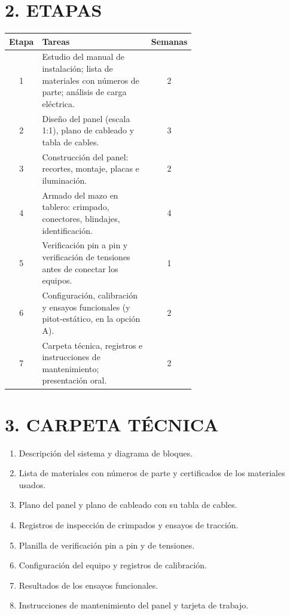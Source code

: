 \section*{2. ETAPAS}
\begin{center}
\small
\begin{tabular}{|c|p{0.62\linewidth}|c|}
\hline
\textbf{Etapa} & \textbf{Tareas} & \textbf{Semanas} \\ \hline
1 & Estudio del manual de instalación; lista de materiales con números de parte; análisis de
carga eléctrica. & 2 \\ \hline
2 & Diseño del panel (escala 1:1), plano de cableado y tabla de cables. & 3 \\ \hline
3 & Construcción del panel: recortes, montaje, placas e iluminación. & 2 \\ \hline
4 & Armado del mazo en tablero: crimpado, conectores, blindajes, identificación. & 4 \\ \hline
5 & Verificación pin a pin y verificación de tensiones antes de conectar los equipos. & 1 \\ \hline
6 & Configuración, calibración y ensayos funcionales (y pitot-estático, en la opción A). & 2 \\
\hline
7 & Carpeta técnica, registros e instrucciones de mantenimiento; presentación oral. & 2 \\ \hline
\end{tabular}
\end{center}

\section*{3. CARPETA TÉCNICA}
\begin{enumerate}
  \item Descripción del sistema y diagrama de bloques.
  \item Lista de materiales con números de parte y certificados de los materiales usados.
  \item Plano del panel y plano de cableado con su tabla de cables.
  \item Registros de inspección de crimpados y ensayos de tracción.
  \item Planilla de verificación pin a pin y de tensiones.
  \item Configuración del equipo y registros de calibración.
  \item Resultados de los ensayos funcionales.
  \item Instrucciones de mantenimiento del panel y tarjeta de trabajo.
\end{enumerate}

